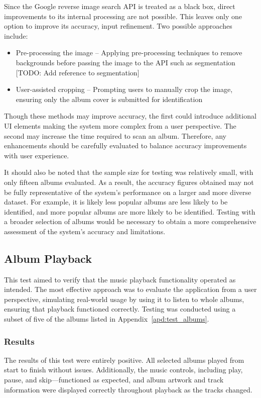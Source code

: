 Since the Google reverse image search API is treated as a black box, direct improvements to its internal processing are not possible. This leaves only one option to improve its accuracy, input refinement. Two possible approaches include:

\begin{itemize}
    \item Pre-processing the image – Applying pre-processing techniques to remove backgrounds before passing the image to the API such as segmentation [TODO: Add reference to segmentation]
    \item User-assisted cropping – Prompting users to manually crop the image, ensuring only the album cover is submitted for identification
\end{itemize}

Though these methods may improve accuracy, the first could introduce additional UI elements making the system more complex from a user perspective. The second may increase the time required to scan an album. Therefore, any enhancements should be carefully evaluated to balance accuracy improvements with user experience.

It should also be noted that the sample size for testing was relatively small, with only fifteen albums evaluated. As a result, the accuracy figures obtained may not be fully representative of the system's performance on a larger and more diverse dataset. For example, it is likely less popular albums are less likely to be identified, and more popular albums are more likely to be identified. Testing with a broader selection of albums would be necessary to obtain a more comprehensive assessment of the system’s accuracy and limitations.

\subsection{Album Playback}
This test aimed to verify that the music playback functionality operated as intended. The most effective approach was to evaluate the application from a user perspective, simulating real-world usage by using it to listen to whole albums, ensuring that playback functioned correctly. Testing was conducted using a subset of five of the albums listed in Appendix~\ref{apd:test_albums}.

\subsubsection{Results}
The results of this test were entirely positive. All selected albums played from start to finish without issues. Additionally, the music controls, including play, pause, and skip—functioned as expected, and album artwork and track information were displayed correctly throughout playback as the tracks changed.

